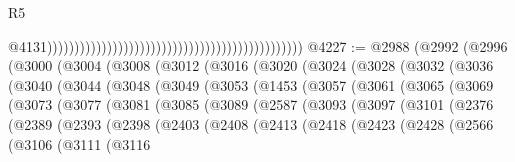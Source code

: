 \begin{lexlean}{R5}
\begin{coremodule}
                                                                                                  @4131)))))))))))))))))))))))))))))))))))))))))))))))
@4227 := @2988
    (@2992
      (@2996
        (@3000
          (@3004
            (@3008
              (@3012
                (@3016
                  (@3020
                    (@3024
                      (@3028
                        (@3032
                          (@3036
                            (@3040
                              (@3044
                                (@3048
                                  (@3049
                                    (@3053
                                      (@1453
                                        (@3057
                                          (@3061
                                            (@3065
                                              (@3069
                                                (@3073
                                                  (@3077
                                                    (@3081
                                                      (@3085
                                                        (@3089
                                                          (@2587
                                                            (@3093
                                                              (@3097
                                                                (@3101
                                                                  (@2376
                                                                    (@2389
                                                                      (@2393
                                                                        (@2398
                                                                          (@2403
                                                                            (@2408
                                                                              (@2413
                                                                                (@2418
                                                                                  (@2423
                                                                                    (@2428
                                                                                      (@2566
                                                                                        (@3106
                                                                                          (@3111
                                                                                            (@3116

\end{coremodule}
\end{lexlean}
